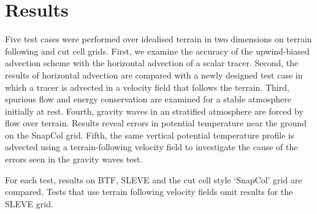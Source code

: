 \chapter{Results}
\label{sec:results}

Five test cases were performed over idealised terrain in two dimensions on terrain following and cut cell grids.  First, we examine the accuracy of the upwind-biased advection scheme with the horizontal advection of a scalar tracer.  Second, the results of horizontal advection are compared with a newly designed test case in which a tracer is advected in a velocity field that follows the terrain.  Third, spurious flow and energy conservation are examined for a stable atmosphere initially at rest.  Fourth, gravity waves in an stratified atmosphere are forced by flow over terrain.  Results reveal errors in potential temperature near the ground on the SnapCol grid.  Fifth, the same vertical potential temperature profile is advected using a terrain-following velocity field to investigate the cause of the errors seen in the gravity waves test.

For each test, results on BTF, SLEVE and the cut cell style `SnapCol' grid are compared.  Tests that use terrain following velocity fields omit results for the SLEVE grid.






